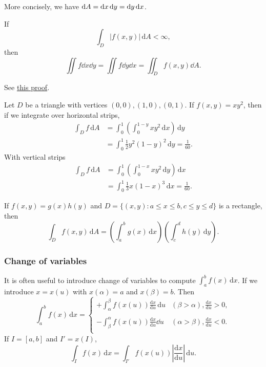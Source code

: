 More concisely, we have $ \mathrm{d} A = \mathrm{d} x\,\mathrm{d} y=\mathrm{d} y\,\mathrm{d} x $.
\begin{theorem}\label{thm:Fubini's theorem}
    If
    \[
        \int_{D} \left| f(x,y) \right| \,\mathrm{d}A<\infty,
    \]
    then 
    \[
        \iint f\dd x\dd y = \iint f\dd y\dd x = \iint_{D}f(x,y)\dd A.
    \]
\end{theorem}
See \href{https://dec41.user.srcf.net/notes/II_M/probability_and_measure.pdf\#page=50}{this proof}.

\begin{example}
    Let $D$ be a triangle with vertices $(0,0),(1,0),(0,1)$. If $f(x,y)=xy^2$, then if we integrate over horizontal strips,
    \begin{align*}
        \int_{D} f \,\mathrm{d}A &= \int_{0}^{1} \left( \int_{0}^{1-y} xy^2 \,\mathrm{d}x \right) \,\mathrm{d}y\\ 
        &= \int_{0}^{1} \frac{1}{2}y^2(1-y)^2 \,\mathrm{d}y = \frac{1}{60}.
    \end{align*}
    With vertical strips 
    \begin{align*}
        \int_{D} f \,\mathrm{d}A &= \int_{0}^{1} \left( \int_{0}^{1-x} xy^2 \,\mathrm{d}y \right) \,\mathrm{d}x\\ 
        &= \int_{0}^{1} \frac{1}{3}x(1-x)^3 \,\mathrm{d}x = \frac{1}{60}.
    \end{align*}
\end{example}

\begin{proposition}
    If $f(x,y)=g(x)h(y)$ and $ D=\{(x,y):a\le x\le b,c\le y\le d\} $ is a rectangle, then 
    \[
        \int_{D} f(x,y) \,\mathrm{d}A = \left( \int_{a}^{b} g(x) \,\mathrm{d}x \right) \left( \int_{c}^{d} h(y) \,\mathrm{d}y \right).
    \]
\end{proposition}

\subsubsection*{Change of variables}

It is often useful to introduce change of variables to compute $ \int_{a}^{b} f(x) \,\mathrm{d}x $. If we introduce $ x=x(u) $ with $ x(\alpha)=a $ and $ x(\beta)=b $. Then 
\[
    \int_{a}^{b} f(x) \,\mathrm{d}x = \begin{cases}
    \displaystyle+\int_{\alpha}^{\beta} f(x(u))\frac{\mathrm{d}x}{\mathrm{d}u}  \,\mathrm{d}u &\displaystyle(\beta>\alpha),\frac{\mathrm{d}x}{\mathrm{d}u}>0, \\
    \\
    \displaystyle-\int_{\beta}^{\alpha} f(x(u))\frac{\mathrm{d}x}{\mathrm{d}u}\dd u &\displaystyle(\alpha>\beta),\frac{\mathrm{d}x}{\mathrm{d}u}<0. \\
    \end{cases} 
\]
If $I=[a,b]$ and $I'=x(I)$,
\[
    \int_{I} f(x) \,\mathrm{d}x = \int_{I'} f(x(u)) \left| \frac{\mathrm{d}x}{\mathrm{d}u}  \right|  \,\mathrm{d}u.
\]

